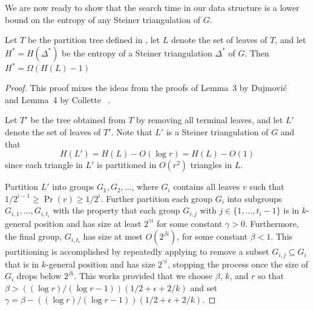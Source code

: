 \documentclass{patmorin}
\begin{document}
We are now ready to show that the search time in our data structure is
a lower bound on the entropy of any Steiner triangulation of $G$.

\begin{lem}
  Let $T$ be the partition tree defined in ,
  let $L$ denote the set of leaves of $T$, and let $H^*=H(\Delta^*)$ be
  the entropy of a Steiner triangulation $\Delta^*$ of $G$.  Then $H^*
  = \Omega(H(L)-1)$
\end{lem}

\begin{proof}
  This proof mixes the ideas from the proofs of Lemma~3 by Dujmovi\'c
  \etal\ \cite{dhm09} and Lemma~4 by Collette \etal\ \cite{cdilm08}.

  Let $T'$ be the tree obtained from $T$ by removing all terminal leaves,
  and let $L'$ denote the set of leaves of $T'$.  Note that $L'$ is a Steiner
  triangulation of $G$ and that 
  \[  
     H(L') = H(L) - O(\log r) = H(L) - O(1)
  \]
  since each triangle in $L'$ is partitioned in $O(r^2)$ triangles in $L$. 

  Partition $L'$ into groups $G_1,G_2,\ldots$, where $G_i$
  contains all leaves $v$ such that $1/2^{i-1} \ge \Pr(v) \ge
  1/2^{i}$.  Further partition each group $G_i$ into subgroups
  $G_{i,1},\ldots,G_{i,t_i}$ with the property that each group $G_{i,j}$
  with $j\in\{1,\ldots,t_i-1\}$ is in $k$-general position and has size
  at least $2^{\gamma i}$ for some constant $\gamma > 0$. Furthermore,
  the final group, $G_{i,t_i}$ has size at most $O(2^{\beta i})$, for some
  constant $\beta < 1$.  This partitioning is accomplished by repeatedly
  applying  to remove a subset $G_{i,j}\subseteq
  G_{i}$ that is in $k$-general position and has size $2^{\gamma i}$,
  stopping the process once the size of $G_i$ drops below $2^{\beta
  i}$. This works provided that we choose $\beta$, $k$, and $r$ so
  that $\beta > ((\log r)/(\log r - 1))(1/2+\epsilon+2/k)$ and set
  $\gamma=\beta - ((\log r)/(\log r - 1))(1/2+\epsilon+2/k)$.


\end{proof}
\end{document}
